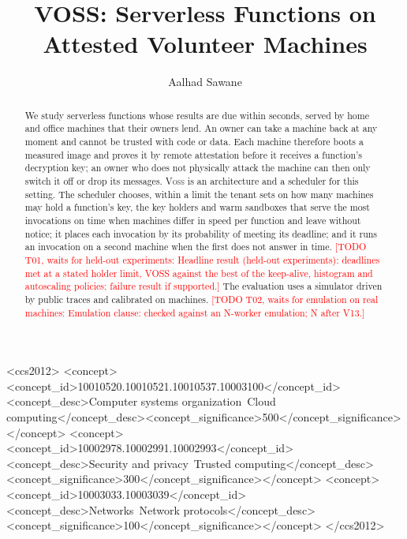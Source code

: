 \documentclass[acmsmall,screen,review]{acmart}
\newcommand{\voss}{\textsc{Voss}}
\newcommand{\todo}[1]{\textcolor{red}{[TODO: #1]}}
\newcommand{\todoitem}[3]{\textcolor{red}{[TODO #1, waits for #2: #3]}}
\begin{document}
\title{VOSS: Serverless Functions on Attested Volunteer Machines}

\author{Aalhad Sawane}
\affiliation{\institution{\todo{institution}}\country{\todo{country}}}

\begin{abstract}
We study serverless functions whose results are due within seconds, served by home and office machines that their
owners lend. An owner can take a machine back at any moment and cannot be trusted with code or data.
Each machine therefore boots a measured image and proves it by remote attestation before it receives a function's
decryption key; an owner who does not physically attack the machine can then only switch it off or drop its
messages. \voss{} is an architecture and a scheduler for this setting. The scheduler chooses, within a limit the tenant
sets on how many machines may hold a function's key, the key holders and warm sandboxes that serve the most
invocations on time when machines differ in speed per function and leave without notice; it places each invocation
by its probability of meeting its deadline; and it runs an invocation on a second machine when the first does not
answer in time.
\todoitem{T01}{held-out experiments}{Headline result (held-out experiments): deadlines met at a stated holder limit, VOSS against the best of
the keep-alive, histogram and autoscaling policies; failure result if supported.}
The evaluation uses a simulator driven by public traces and calibrated on \VMachCount{} machines.
\todoitem{T02}{emulation on real machines}{Emulation clause: checked against an N-worker emulation; N after V13.}
\end{abstract}

\begin{CCSXML}
<ccs2012>
<concept><concept_id>10010520.10010521.10010537.10003100</concept_id><concept_desc>Computer systems organization~Cloud computing</concept_desc><concept_significance>500</concept_significance></concept>
<concept><concept_id>10002978.10002991.10002993</concept_id><concept_desc>Security and privacy~Trusted computing</concept_desc><concept_significance>300</concept_significance></concept>
<concept><concept_id>10003033.10003039</concept_id><concept_desc>Networks~Network protocols</concept_desc><concept_significance>100</concept_significance></concept>
</ccs2012>
\end{CCSXML}


\maketitle










\appendix




\end{document}
